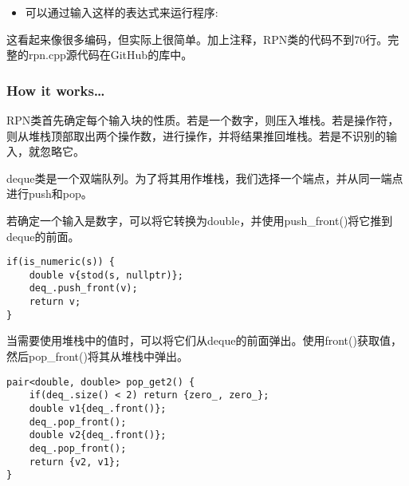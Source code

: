 \begin{itemize}
\begin{lstlisting}[style=styleCXX]
int main() {
	RPN rpn;
	
	for(string o{}; cin >> o; ) {
		rpn.op(o);
		auto stack_str{rpn.get_stack_string()};
		cout << format("{}: {}\n", o, stack_str);
	}
}
\end{lstlisting}

我们将通过从命令行将字符串输送到程序中来进行测试，使用for循环从cin流中获取每个单词，并将其传递给rpn.op()。我喜欢这里的for循环，因为它很容易包含o变量的作用域。然后在每个命令行项后使用get\_stack\_string()函数打印堆栈。

\item 
可以通过输入这样的表达式来运行程序:

\end{itemize}

这看起来像很多编码，但实际上很简单。加上注释，RPN类的代码不到70行。完整的rpn.cpp源代码在GitHub的库中。

\subsubsection{How it works…}

RPN类首先确定每个输入块的性质。若是一个数字，则压入堆栈。若是操作符，则从堆栈顶部取出两个操作数，进行操作，并将结果推回堆栈。若是不识别的输入，就忽略它。

deque类是一个双端队列。为了将其用作堆栈，我们选择一个端点，并从同一端点进行push和pop。

若确定一个输入是数字，可以将它转换为double，并使用push\_front()将它推到deque的前面。

\begin{lstlisting}[style=styleCXX]
if(is_numeric(s)) {
	double v{stod(s, nullptr)};
	deq_.push_front(v);
	return v;
}
\end{lstlisting}

当需要使用堆栈中的值时，可以将它们从deque的前面弹出。使用front()获取值，然后pop\_front()将其从堆栈中弹出。

\begin{lstlisting}[style=styleCXX]
pair<double, double> pop_get2() {
	if(deq_.size() < 2) return {zero_, zero_};
	double v1{deq_.front()};
	deq_.pop_front();
	double v2{deq_.front()};
	deq_.pop_front();
	return {v2, v1};
}
\end{lstlisting}

